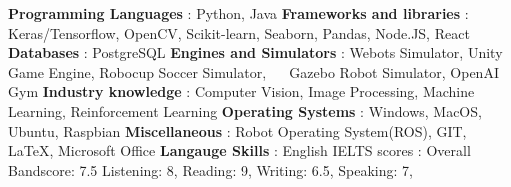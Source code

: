\begin{cventries}  
\skillentry
    {
    \bullet \space \textbf{Programming Languages} : Python, Java \newline
    \bullet \space \textbf{Frameworks and libraries} : Keras/Tensorflow, OpenCV, Scikit-learn, Seaborn, Pandas, Node.JS, React \newline
    \bullet \space \textbf{Databases} : PostgreSQL \newline
    \bullet \space \textbf{Engines and Simulators} : Webots Simulator, Unity Game Engine, Robocup Soccer Simulator, \newline $\quad$ Gazebo Robot Simulator, OpenAI Gym \newline
    \bullet \space \textbf{Industry knowledge} : Computer Vision, Image Processing, Machine Learning, Reinforcement Learning \newline
    \bullet \space \textbf{Operating Systems} : Windows, MacOS, Ubuntu, Raspbian \newline
    \bullet \space \textbf{Miscellaneous} : Robot Operating System(ROS), GIT, LaTeX, Microsoft Office \newline
    \bullet \space \textbf{Langauge Skills} : English IELTS scores : Overall Bandscore: 7.5 \hspace{5 mm} Listening: 8,\hspace{5 mm} Reading: 9,\hspace{5 mm} Writing: 6.5,\hspace{5 mm} Speaking: 7,\hspace{5 mm} 
    }
\end{cventries}
